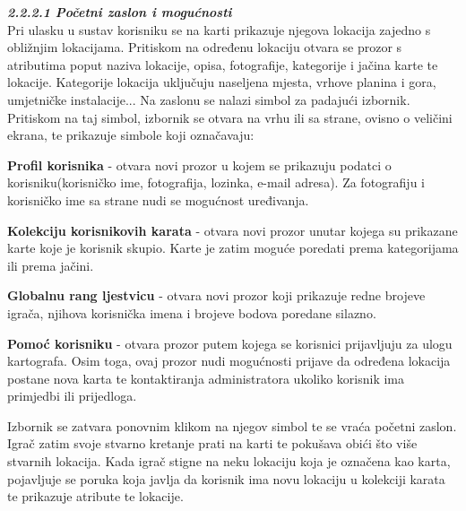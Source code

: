 		\textbf{\textit{\small2.2.2.1 Početni zaslon i mogućnosti}}\\
		
		
		{Pri ulasku u sustav korisniku se na karti prikazuje njegova lokacija zajedno s obližnjim lokacijama. Pritiskom na određenu lokaciju otvara se prozor s atributima poput naziva lokacije, opisa, fotografije, kategorije i jačina karte te lokacije. Kategorije lokacija uključuju naseljena mjesta, vrhove planina i gora, umjetničke instalacije... Na zaslonu se nalazi simbol za padajući izbornik. Pritiskom na taj simbol, izbornik se otvara na vrhu ili sa strane, ovisno o veličini ekrana, te prikazuje simbole koji označavaju:  }
		
			\begin{packed_item}
			\item {\textbf{Profil korisnika }- otvara novi prozor u kojem se prikazuju podatci o korisniku(korisničko ime, fotografija, lozinka, e-mail adresa). Za fotografiju i korisničko ime sa strane nudi se mogućnost uređivanja.}\\
			\item {\textbf{Kolekciju korisnikovih karata} - otvara novi prozor unutar kojega su prikazane karte koje je korisnik skupio. Karte je zatim moguće poredati prema kategorijama ili prema jačini.}\\
			\item {\textbf{Globalnu rang ljestvicu} - otvara novi prozor koji prikazuje redne brojeve igrača, njihova korisnička imena i brojeve bodova poredane silazno.}\\
			\item {\textbf{Pomoć korisniku} - otvara prozor putem kojega se korisnici prijavljuju za ulogu kartografa. Osim toga, ovaj prozor nudi mogućnosti prijave da određena lokacija postane nova karta te kontaktiranja administratora ukoliko korisnik ima primjedbi ili prijedloga. }
			\end{packed_item}
		
		{Izbornik se zatvara ponovnim klikom na njegov simbol te se vraća početni zaslon. Igrač zatim svoje stvarno kretanje prati na karti te pokušava obići što više stvarnih lokacija. Kada igrač stigne na neku lokaciju koja je označena kao karta, pojavljuje se poruka koja javlja da korisnik ima novu lokaciju u kolekciji karata te prikazuje atribute te lokacije.}\newpage
		
